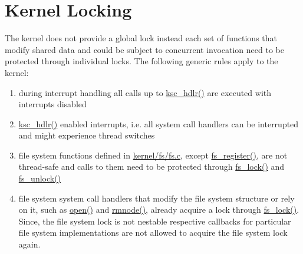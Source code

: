 \section{Kernel Locking}

The kernel does not provide a global lock instead each set of functions that modify shared data and could be subject to concurrent invocation need to be protected through individual locks. The following generic rules apply to the kernel:
\begin{enumerate}
	\item during interrupt handling all calls up to \hyperref[kernel_2syscall_8c_a7af5fd6fbe3d25d1a6c23a7cfb8c5822]{ksc\_hdlr()} are executed with interrupts disabled
	\item \hyperref[kernel_2syscall_8c_a7af5fd6fbe3d25d1a6c23a7cfb8c5822]{ksc\_hdlr()} enabled interrupts, i.e. all system call handlers can be interrupted and might experience thread switches
	\item file system functions defined in \hyperref[fs_8c]{kernel/fs/fs.c}, except \hyperref[fs_8c_a11ce2a4ca94ef9167c296a3788c466a5]{fs\_register()}, are not thread-safe and calls to them need to be protected through \hyperref[fs_8c_a5d8afec6e07924b790d1de8c4b5e416a]{fs\_lock()} and \hyperref[fs_8c_a6becda9de89bcff22da1b19436174d13]{fs\_unlock()}
	\item file system system call handlers that modify the file system structure or rely on it, such as \hyperref[structfs__ops__t_a0ea05ccab180719ed0f32631d5ad71bf]{open()} and \hyperref[structfs__ops__t_a98fe7490086237888a48187e06214cc6]{rmnode()}, already acquire a lock through \hyperref[fs_8c_a5d8afec6e07924b790d1de8c4b5e416a]{fs\_lock()}. Since, the file system lock is not nestable respective callbacks for particular file system implementations are not allowed to acquire the file system lock again.
\end{enumerate}
